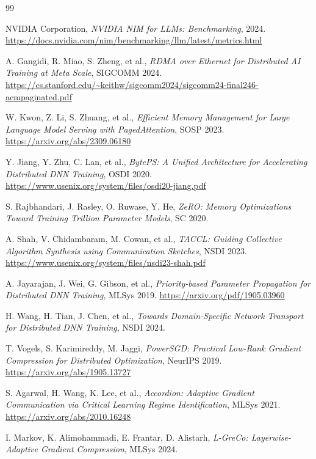 \documentclass[10pt,letterpaper]{article}
\begin{document}
\newpage

\begin{thebibliography}{99}

NVIDIA Corporation,
\textit{NVIDIA NIM for LLMs: Benchmarking},
2024.
\url{https://docs.nvidia.com/nim/benchmarking/llm/latest/metrics.html}

A. Gangidi, R. Miao, S. Zheng, et al.,
\textit{RDMA over Ethernet for Distributed AI Training at Meta Scale},
SIGCOMM 2024.
\url{https://cs.stanford.edu/~keithw/sigcomm2024/sigcomm24-final246-acmpaginated.pdf}

W. Kwon, Z. Li, S. Zhuang, et al.,
\textit{Efficient Memory Management for Large Language Model Serving with PagedAttention},
SOSP 2023.
\url{https://arxiv.org/abs/2309.06180}

Y. Jiang, Y. Zhu, C. Lan, et al.,
\textit{BytePS: A Unified Architecture for Accelerating Distributed DNN Training},
OSDI 2020.
\url{https://www.usenix.org/system/files/osdi20-jiang.pdf}

S. Rajbhandari, J. Rasley, O. Ruwase, Y. He,
\textit{ZeRO: Memory Optimizations Toward Training Trillion Parameter Models},
SC 2020.

A. Shah, V. Chidambaram, M. Cowan, et al.,
\textit{TACCL: Guiding Collective Algorithm Synthesis using Communication Sketches},
NSDI 2023.
\url{https://www.usenix.org/system/files/nsdi23-shah.pdf}

A. Jayarajan, J. Wei, G. Gibson, et al.,
\textit{Priority-based Parameter Propagation for Distributed DNN Training},
MLSys 2019.
\url{https://arxiv.org/pdf/1905.03960}

H. Wang, H. Tian, J. Chen, et al.,
\textit{Towards Domain-Specific Network Transport for Distributed DNN Training},
NSDI 2024.

T. Vogels, S. Karimireddy, M. Jaggi,
\textit{PowerSGD: Practical Low-Rank Gradient Compression for Distributed Optimization},
NeurIPS 2019.
\url{https://arxiv.org/abs/1905.13727}

S. Agarwal, H. Wang, K. Lee, et al.,
\textit{Accordion: Adaptive Gradient Communication via Critical Learning Regime Identification},
MLSys 2021.
\url{https://arxiv.org/abs/2010.16248}

I. Markov, K. Alimohammadi, E. Frantar, D. Alistarh,
\textit{L-GreCo: Layerwise-Adaptive Gradient Compression},
MLSys 2024.


\end{thebibliography}
\end{document}

